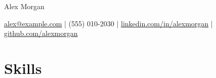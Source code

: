                        

% 





\centerline{\Huge Alex Morgan}

\vspace{5pt}

\centerline{\href{mailto:alex@example.com}{alex@example.com} | (555) 010-2030 | \href{https://linkedin.com/in/alexmorgan}{linkedin.com/in/alexmorgan} | \href{https://github.com/alexmorgan}{github.com/alexmorgan}}

\vspace{-10pt}

\section*{Skills}
\label{skillsSection}


